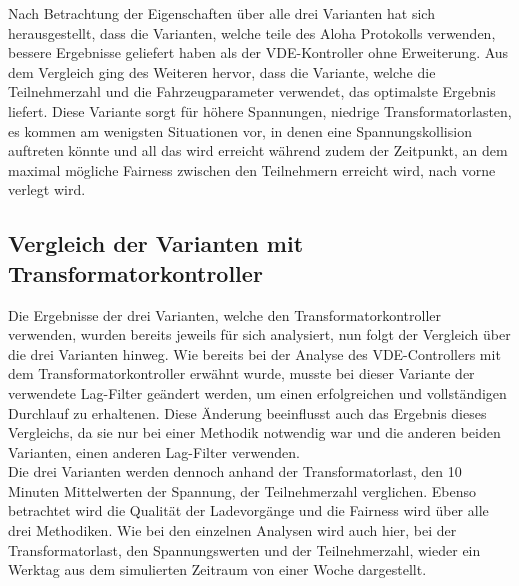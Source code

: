 Nach Betrachtung der Eigenschaften über alle drei Varianten hat sich herausgestellt, dass die Varianten, welche teile des Aloha Protokolls verwenden, bessere Ergebnisse geliefert haben als der VDE-Kontroller ohne Erweiterung. Aus dem Vergleich ging des Weiteren hervor, dass die Variante, welche die Teilnehmerzahl und die Fahrzeugparameter verwendet, das optimalste Ergebnis liefert. Diese Variante sorgt für höhere Spannungen, niedrige Transformatorlasten, es kommen am wenigsten Situationen vor, in denen eine Spannungskollision auftreten könnte und all das wird erreicht während zudem der Zeitpunkt, an dem maximal mögliche Fairness zwischen den Teilnehmern erreicht wird, nach vorne verlegt wird.

\subsection{Vergleich der Varianten mit Transformatorkontroller}
Die Ergebnisse der drei Varianten, welche den Transformatorkontroller verwenden, wurden bereits jeweils für sich analysiert, nun folgt der Vergleich über die drei Varianten hinweg. Wie bereits bei der Analyse des VDE-Controllers mit dem Transformatorkontroller erwähnt wurde, musste bei dieser Variante der verwendete Lag-Filter geändert werden, um einen erfolgreichen und vollständigen Durchlauf zu erhaltenen. Diese Änderung beeinflusst auch das Ergebnis dieses Vergleichs, da sie nur bei einer Methodik notwendig war und die anderen beiden Varianten, einen anderen Lag-Filter verwenden.\\
Die drei Varianten werden dennoch anhand der Transformatorlast, den 10 Minuten Mittelwerten der Spannung, der Teilnehmerzahl verglichen. Ebenso betrachtet wird die Qualität der Ladevorgänge und die Fairness wird über alle drei Methodiken. Wie bei den einzelnen Analysen wird auch hier, bei der Transformatorlast, den Spannungswerten und der Teilnehmerzahl, wieder ein Werktag aus dem simulierten Zeitraum von einer Woche dargestellt.\\
